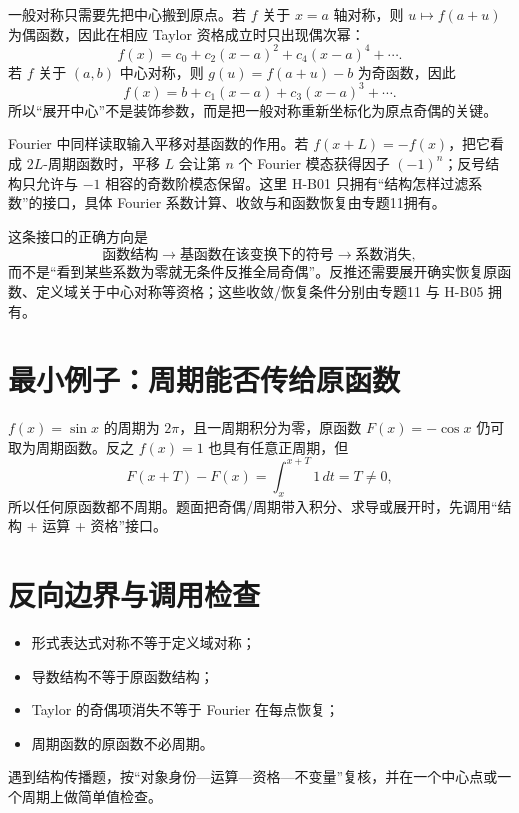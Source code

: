 \documentclass[11pt,a4paper]{ctexart}
\begin{document}
一般对称只需要先把中心搬到原点。若 $f$ 关于 $x=a$ 轴对称，则 $u\mapsto f(a+u)$ 为偶函数，因此在相应 Taylor 资格成立时只出现偶次幂：
\[
\boxed{f(x)=c_0+c_2(x-a)^2+c_4(x-a)^4+\cdots}.
\]
若 $f$ 关于 $(a,b)$ 中心对称，则 $g(u)=f(a+u)-b$ 为奇函数，因此
\[
\boxed{f(x)=b+c_1(x-a)+c_3(x-a)^3+\cdots}.
\]
所以“展开中心”不是装饰参数，而是把一般对称重新坐标化为原点奇偶的关键。

Fourier 中同样读取输入平移对基函数的作用。若 $f(x+L)=-f(x)$，把它看成 $2L$-周期函数时，平移 $L$ 会让第 $n$ 个 Fourier 模态获得因子 $(-1)^n$；反号结构只允许与 $-1$ 相容的奇数阶模态保留。这里 H-B01 只拥有“结构怎样过滤系数”的接口，具体 Fourier 系数计算、收敛与和函数恢复由专题11拥有。

这条接口的正确方向是
\[
\boxed{\text{函数结构}\to\text{基函数在该变换下的符号}\to\text{系数消失}},
\]
而不是“看到某些系数为零就无条件反推全局奇偶”。反推还需要展开确实恢复原函数、定义域关于中心对称等资格；这些收敛/恢复条件分别由专题11 与 H-B05 拥有。

\section{最小例子：周期能否传给原函数}
$f(x)=\sin x$ 的周期为 $2\pi$，且一周期积分为零，原函数 $F(x)=-\cos x$ 仍可取为周期函数。反之 $f(x)=1$ 也具有任意正周期，但
\[
F(x+T)-F(x)=\int_x^{x+T}1\,dt=T\ne0,
\]
所以任何原函数都不周期。题面把奇偶/周期带入积分、求导或展开时，先调用“结构 + 运算 + 资格”接口。

\section{反向边界与调用检查}
\begin{itemize}
\item 形式表达式对称不等于定义域对称；
\item 导数结构不等于原函数结构；
\item Taylor 的奇偶项消失不等于 Fourier 在每点恢复；
\item 周期函数的原函数不必周期。
\end{itemize}
遇到结构传播题，按“对象身份—运算—资格—不变量”复核，并在一个中心点或一个周期上做简单值检查。
\end{document}
